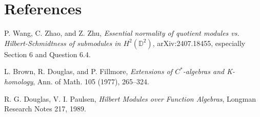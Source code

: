 \documentclass[11pt]{article}
\newcommand{\D}{\mathbb D}
\begin{document}
\section*{References}
\begin{enumerate}[label={[\arabic*]}]
\item P. Wang, C. Zhao, and Z. Zhu, \emph{Essential normality of quotient
modules vs. Hilbert-Schmidtness of submodules in \(H^2(\D^2)\)},
arXiv:2407.18455, especially Section 6 and Question 6.4.
\item L. Brown, R. Douglas, and P. Fillmore, \emph{Extensions of
\(C^*\)-algebras and K-homology}, Ann. of Math. 105 (1977), 265--324.
\item R. G. Douglas, V. I. Paulsen, \emph{Hilbert Modules over Function
Algebras}, Longman Research Notes 217, 1989.
\end{enumerate}
\end{document}
